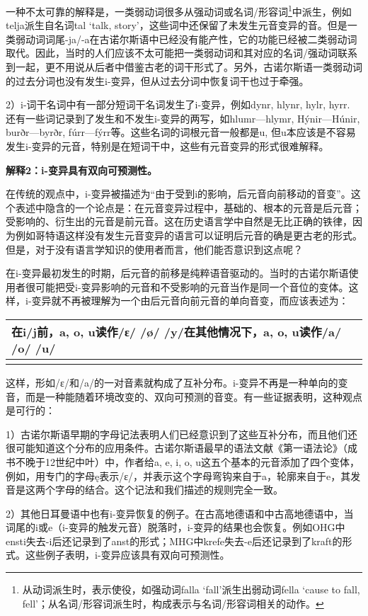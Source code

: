 一种不太可靠的解释是，一类弱动词很多从强动词或名词/形容词\footnote{从动词派生时，表示使役，如强动词falla
  `fall'派生出弱动词fella `cause to fall,
  fell'；从名词/形容词派生时，构成表示与名词/形容词相关的动作。}中派生，例如telja派生自名词tal
`talk,
story'，这些词中还保留了未发生元音变异的音。但是一类弱动词词尾-ja/-a在古诺尔斯语中已经没有能产性，它的功能已经被二类弱动词取代。因此，当时的人们应该不太可能把一类弱动词和其对应的名词/强动词联系到一起，更不用说从后者中借鉴古老的词干形式了。另外，古诺尔斯语一类弱动词的过去分词也没有发生i-变异，但从过去分词中恢复词干也过于牵强。

2）i-词干名词中有一部分短词干名词发生了i-变异，例如dynr, hlynr, hylr,
hyrr. 还有一些词记录到了发生和不发生i-变异的两写，如hlumr---hlymr,
Hýnir---Húnir, burðr---byrðr,
fúrr---fýrr等。这些名词的词根元音一般都是u,
但u本应该是不容易发生i-变异的元音，特别是在短词干中，这些有元音变异的形式很难解释。

\textbf{解释2：i-变异具有双向可预测性。}

在传统的观点中，i-变异被描述为``由于受到i的影响，后元音向前移动的音变''。这个表述中隐含的一个论点是：在元音变异过程中，基础的、根本的元音是后元音；受影响的、衍生出的元音是前元音。这在历史语言学中自然是无比正确的铁律，因为例如哥特语这样没有发生元音变异的语言可以证明后元音的确是更古老的形式。但是，对于没有语言学知识的使用者而言，他们能否意识到这点呢？

在i-变异最初发生的时期，后元音的前移是纯粹语音驱动的。当时的古诺尔斯语使用者很可能把受i-变异影响的元音和不受影响的元音当作是同一个音位的变体。这样，i-变异就不再被理解为一个由后元音向前元音的单向音变，而应该表述为：

\begin{longtable}{l}
\toprule
在i/j前，a, o, u读作/ɛ/ /ø/ /y/在其他情况下，a, o, u读作/a/ /o/ /u/ \\
\midrule
\endhead
\bottomrule
\endfoot
\end{longtable}

这样，形如/ɛ/和/a/的一对音素就构成了互补分布。i-变异不再是一种单向的变音，而是一种能随着环境改变的、双向可预测的音变。有一些证据表明，这种观点是可行的：

1）古诺尔斯语早期的字母记法表明人们已经意识到了这些互补分布，而且他们还很可能知道这个分布的应用条件。古诺尔斯语最早的语法文献《第一语法论》（成书不晚于12世纪中叶）中，作者给a,
e, i, o,
u这五个基本的元音添加了四个变体，例如，用专门的字母ę表示/ɛ/，并表示这个字母弯钩来自于a，轮廓来自于e，其发音是这两个字母的结合。这个记法和我们描述的规则完全一致。

2）其他日耳曼语中也有i-变异恢复的例子。在古高地德语和中古高地德语中，当词尾的i或e（i-变异的触发元音）脱落时，i-变异的结果也会恢复。例如OHG中ensti失去-i后还记录到了anst的形式；MHG中krefe失去-e后还记录到了kraft的形式。这些例子表明，i-变异应该具有双向可预测性。

